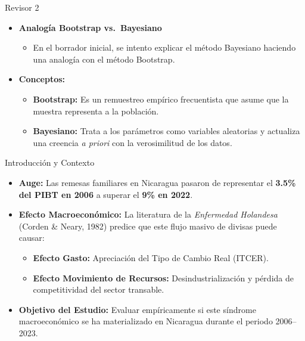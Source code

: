 \documentclass[
  10pt,
  ignorenonframetext,
  aspectratio=169,
  spanish,
]{beamer}
\providecommand{\tightlist}{%
  \setlength{\itemsep}{0pt}\setlength{\parskip}{0pt}}
\begin{document}
\begin{frame}{Revisor 2}
\protect{}\label{revisor-2-1}
\begin{itemize}
\tightlist
\item
  \textbf{Analogía Bootstrap vs.~Bayesiano}

  \begin{itemize}
  \tightlist
  \item
    En el borrador inicial, se intento explicar el método Bayesiano
    haciendo una analogía con el método Bootstrap.
  \end{itemize}
\item
  \textbf{Conceptos:}

  \begin{itemize}
  \tightlist
  \item
    \textbf{Bootstrap:} Es un remuestreo empírico frecuentista que asume
    que la muestra representa a la población.
  \item
    \textbf{Bayesiano:} Trata a los parámetros como variables aleatorias
    y actualiza una creencia \emph{a priori} con la verosimilitud de los
    datos.
  \end{itemize}
\end{itemize}
\end{frame}

\begin{frame}{Introducción y Contexto}
\protect{}\label{introducciuxf3n-y-contexto}
\begin{itemize}
\tightlist
\item
  \textbf{Auge:} Las remesas familiares en Nicaragua pasaron de
  representar el \textbf{3.5\% del PIBT en 2006} a superar el
  \textbf{9\% en 2022}.
\item
  \textbf{Efecto Macroeconómico:} La literatura de la \emph{Enfermedad
  Holandesa} (Corden \& Neary, 1982) predice que este flujo masivo de
  divisas puede causar:

  \begin{itemize}
  \tightlist
  \item
    \textbf{Efecto Gasto:} Apreciación del Tipo de Cambio Real (ITCER).
  \item
    \textbf{Efecto Movimiento de Recursos:} Desindustrialización y
    pérdida de competitividad del sector transable.
  \end{itemize}
\item
  \textbf{Objetivo del Estudio:} Evaluar empíricamente si este síndrome
  macroeconómico se ha materializado en Nicaragua durante el periodo
  2006--2023.
\end{itemize}
\end{frame}
\end{document}
